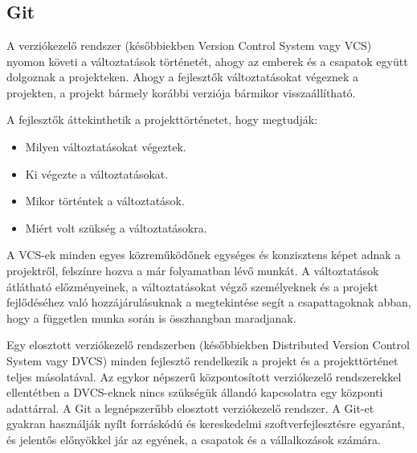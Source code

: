 \chapter{\github}
\section{Git}
A verziókezelő rendszer (későbbiekben Version Control System vagy VCS) nyomon követi a változtatások történetét, ahogy az emberek és a csapatok együtt dolgoznak a projekteken.
Ahogy a fejlesztők változtatásokat végeznek a projekten, a projekt bármely korábbi verziója bármikor visszaállítható.

A fejlesztők áttekinthetik a projekttörténetet, hogy megtudják:
\begin{itemize}
  \item Milyen változtatásokat végeztek.
  \item Ki végezte a változtatásokat.
  \item Mikor történtek a változtatások.
  \item Miért volt szükség a változtatásokra.
\end{itemize}

A VCS-ek minden egyes közreműködőnek egységes és konzisztens képet adnak a projektről, felszínre hozva a már folyamatban lévő munkát.
A változtatások átlátható előzményeinek, a változtatásokat végző személyeknek és a projekt fejlődéséhez való hozzájárulásuknak a megtekintése segít a csapattagoknak abban, hogy a független munka során is összhangban maradjanak.

Egy elosztott verziókezelő rendszerben (későbbiekben Distributed Version Control System vagy DVCS) minden fejlesztő rendelkezik a projekt és a projekttörténet teljes másolatával.
Az egykor népszerű központosított verziókezelő rendszerekkel ellentétben a DVCS-eknek nincs szükségük állandó kapcsolatra egy központi adattárral.
A Git a legnépszerűbb elosztott verziókezelő rendszer. A Git-et gyakran használják nyílt forráskódú és kereskedelmi szoftverfejlesztésre egyaránt, és jelentős előnyökkel jár az egyének, a csapatok és a vállalkozások számára.

